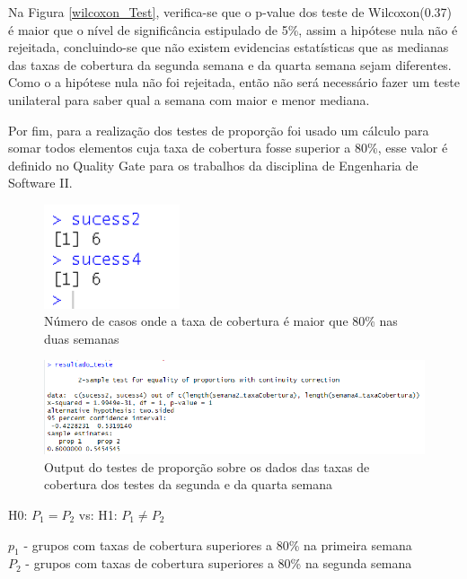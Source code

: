 \documentclass[%
 aip,
cp,  %
 amsmath,amssymb,%
 reprint,%
]{revtex4-2}
\begin{document}
 
Na Figura \ref{wilcoxon_Test}, verifica-se que o p-value dos teste de Wilcoxon(0.37) é maior que o nível de significância estipulado de 5\%, assim a hipótese nula não é rejeitada, concluindo-se que não existem evidencias estatísticas que as medianas das taxas de cobertura da segunda semana e da quarta semana sejam diferentes.
Como o a hipótese nula não foi rejeitada, então não será necessário fazer um teste unilateral para saber qual a semana com maior e menor mediana.


Por fim, para a realização dos testes de proporção foi usado um cálculo para somar todos elementos cuja taxa de cobertura fosse superior a 80\%, esse valor é definido no Quality Gate para os trabalhos da disciplina de Engenharia de Software II.

\begin{figure}[h]
    \centering
    \includegraphics[width=4cm]{imagens/numero_casos.png}
    \caption{Número de casos onde a taxa de cobertura é maior que 80\% nas duas semanas}
    \label{num_casos}
\end{figure}

\begin{figure}[!h]
    \centering
    \includegraphics[width=16cm]{imagens/questao1/Output_teste_proporcao.png}
    \caption{Output do testes de proporção sobre os dados das taxas de cobertura dos testes da segunda e da quarta semana}
    \label{OutputProporcao}
\end{figure}

\hfill \break
\begin{center}
    H0: $P_1 = P_2$
    \newline
    vs:
    \newline
    H1: $P_1 \ne P_2$
    \newline
\end{center}
\hfill \break
$p_1$ - grupos com taxas de cobertura superiores a 80\% na primeira semana\\
$P_2$ - grupos com taxas de cobertura superiores a 80\% na segunda semana\\
\end{document}
